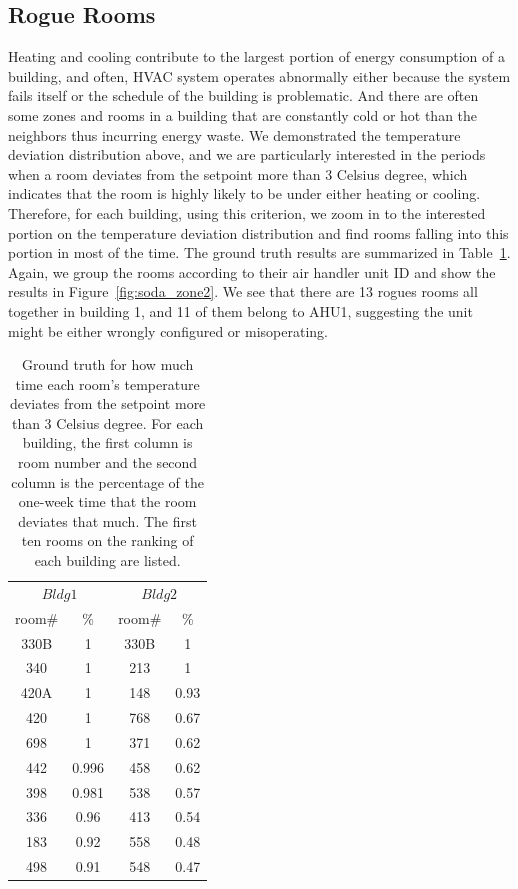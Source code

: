 \subsection{Rogue Rooms}
Heating and cooling contribute to the largest portion of energy consumption of a building, and often, HVAC system operates abnormally either because the system fails itself or the schedule of the building is problematic. And there are often some zones and rooms in a building that are constantly cold or hot than the neighbors thus incurring energy waste. We demonstrated the temperature deviation distribution above, and we are particularly interested in the periods when a room deviates from the setpoint more than 3 Celsius degree, which indicates that the room is highly likely to be under either heating or cooling. Therefore, for each building, using this criterion, we zoom in to the interested portion on the temperature deviation distribution and find rooms falling into this portion in most of the time. The ground truth results are summarized in Table~\ref{tab:rogue}. Again, we group the rooms according to their air handler unit ID and show the results in Figure~\ref{fig:soda_zone2}. We see that there are 13 rogues rooms all together in building 1, and 11 of them belong to AHU1, suggesting the unit might be either wrongly configured or misoperating.

\begin{table}[h!]
 \begin{center}
	\begin{tabular}{|c|c|c|c|}
	\multicolumn{2}{c}{$Bldg 1$}
	 & \multicolumn{2}{c}{$Bldg 2$}\\
	\cline{1-4} 
	 room\# & \% & room\# & \%\\
	\cline{1-4}
	 330B & 1 & 330B & 1\\
	\cline{1-4}
	 340 & 1 & 213 & 1\\
	\cline{1-4}
	420A & 1 & 148 & 0.93\\
	\cline{1-4}
	420 & 1 & 768 & 0.67\\
	\cline{1-4}
	698 & 1 & 371 & 0.62\\
	\cline{1-4}
	442 & 0.996 & 458 & 0.62\\
	\cline{1-4}
	398 & 0.981 & 538 & 0.57\\
	\cline{1-4}
	336 & 0.96 & 413 & 0.54\\
	\cline{1-4}
	183 & 0.92 & 558 & 0.48\\
	\cline{1-4}
	498 & 0.91 & 548 & 0.47\\
	\cline{1-4}
	\end{tabular}
 \end{center}
 \caption{Ground truth for how much time each room's temperature deviates from the setpoint more than 3 Celsius degree. For each building, the first column is room number and the second column is the percentage of the one-week time that the room deviates that much. The first ten rooms on the ranking of each building are listed.}
 \label{tab:rogue}
\end{table}

